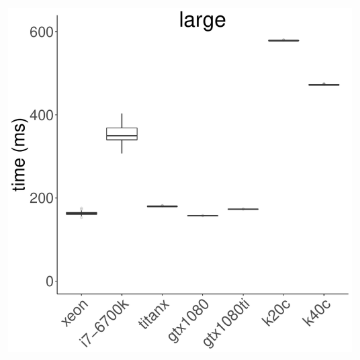 \documentclass[../document.tex]{subfiles}
\begin{document}
\begin{figure}
\begin{subfigure}{0.9\textwidth}
		\includegraphics[width=\plotwidth]{figures/time-results/generate_kmeans_no_knl_large_boxplot-1}
	\end{subfigure}


\end{figure}
\end{document}
